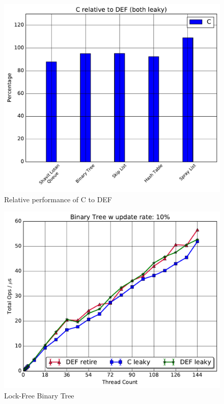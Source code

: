 \begin{figure}
\includegraphics[scale=0.4]{gfx/relativeperf.pdf}
\caption{Relative performance of C to DEF}
\label{fig:relativeperf}
\end{figure}

\begin{figure}
\includegraphics[scale=.4]{gfx/BinaryTreeLight.pdf}
\caption{Lock-Free Binary Tree}
\label{fig:bintreelight}
\end{figure}

